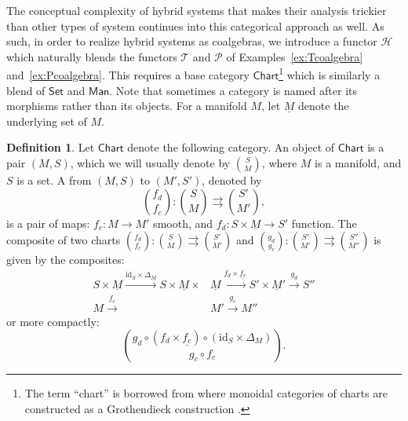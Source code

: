 \documentclass[letterpaper, 10 pt, conference]{IEEEconf}
\theoremstyle{definition}
\newtheorem{defn}[thm]{Definition}
\newcommand{\define}[1]{{\bf \boldmath{#1}}}
\newcommand{\maps}{\colon}
\newcommand{\id}{\mathrm{id}}
\newcommand{\chart}{\rightrightarrows}
\newcommand{\namedcat}[1]{\mathsf{#1}}
\newcommand{\Chart}{\namedcat{Chart}}
\newcommand{\Man}{\namedcat{Man}}
\newcommand{\Set}{\namedcat{Set}}
\newcommand{\functor}[1]{\mathcal{#1}}
\renewcommand{\H}{\functor{H}}
\renewcommand{\P}{\functor{P}}
\newcommand{\T}{\functor{T}}
\newcommand{\U}[1]{\underline{#1}}
\begin{document}
The conceptual complexity of hybrid systems that makes their analysis trickier than other types of system continues into this categorical approach as well. As such, in order to realize hybrid systems as coalgebras, we introduce a functor $\H$ which naturally blends the functors $\T$ and $\P$ of Examples~\ref{ex:Tcoalgebra} and~\ref{ex:Pcoalgebra}. This requires a base category $\Chart$\footnote{The term ``chart'' is borrowed from \cite{CategoricalSystemsTheory} where monoidal categories of charts are constructed as a Grothendieck construction \cite{MonGroth}.} which is similarly a blend of $\Set$ and $\Man$. Note that sometimes a category is named after its morphisms rather than its objects. For a manifold $M$, let $\underline M$ denote the underlying set of $M$. 

\begin{defn}
\label{def:chart}
    Let $\Chart$ denote the following category. An object of $\Chart$ is a pair $(M, S)$, which we will usually denote by $\binom SM$, where $M$ is a manifold, and $S$ is a set. 
    A \define{chart} from $(M,S)$ to $(M',S')$, denoted by \[\binom{f_d}{f_c} \maps \binom SM \chart \binom{S'}{M'},\] is a pair of maps: $f_c \maps M \to M'$ smooth, and $f_d \maps S \times \U M \to S'$ function.
    The composite of two charts $\binom{f_d}{f_c} \maps \binom SM \chart \binom{S'}{M'}$ and $\binom{g_d}{g_c} \maps \binom{S'}{M'} \chart \binom{S''}{M''}$ is given by the composites:
    \begin{align*}
        S \times \underline M \xrightarrow{\id_S \times \Delta_M} S \times \underline M \times &\underline M \xrightarrow{f_d \times \underline{f_c}} S' \times \underline M' \xrightarrow{g_d} S''
        \\
        M \xrightarrow{f_c} &M' \xrightarrow{g_c} M''
    \end{align*}
    or more compactly:
    \[\binom{g_d \circ (f_d \times \underline{f_c}) \circ (\id_S \times \Delta_M)}{g_c \circ f_c}.\]
\end{defn}
\end{document}
